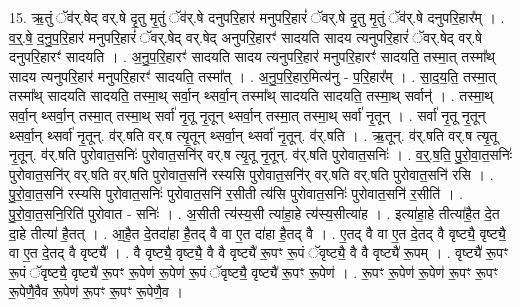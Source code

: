 \documentclass[17pt]{extarticle}
\begin{document}
15. ऋ॒तुं ॅव॑र्.षेद् वर्.षे दृ॒तु मृ॒तुं ॅव॑र्.षे दनुपरि॒हार॑ मनुपरि॒हारं॑ ॅवर्.षे दृ॒तु मृ॒तुं ॅव॑र्.षे दनुपरि॒हार᳚म् । . व॒र्॒.षे॒ द॒नु॒प॒रि॒हार॑ मनुपरि॒हारं॑ ॅवर्.षेद् वर्.षेद् अनुपरि॒हारꣳ॑ सादयति सादय त्यनुपरि॒हारं॑ ॅवर्.षेद् वर्.षे दनुपरि॒हारꣳ॑ सादयति । . अ॒नु॒प॒रि॒हारꣳ॑ सादयति सादय त्यनुपरि॒हार॑ मनुपरि॒हारꣳ॑ सादयति॒ तस्मा॒त् तस्मा᳚थ् सादय त्यनुपरि॒हार॑ मनुपरि॒हारꣳ॑ सादयति॒ तस्मा᳚त् । . अ॒नु॒प॒रि॒हार॒मित्य॑नु - प॒रि॒हार᳚म् । . सा॒द॒य॒ति॒ तस्मा॒त् तस्मा᳚थ् सादयति सादयति॒ तस्मा॒थ् सर्वा॒न् थ्सर्वा॒न् तस्मा᳚थ् सादयति सादयति॒ तस्मा॒थ् सर्वान्॑ । . तस्मा॒थ् सर्वा॒न् थ्सर्वा॒न् तस्मा॒त् तस्मा॒थ् सर्वा॑ नृ॒तू नृ॒तून् थ्सर्वा॒न् तस्मा॒त् तस्मा॒थ् सर्वा॑ नृ॒तून् । . सर्वा॑ नृ॒तू नृ॒तून् थ्सर्वा॒न् थ्सर्वा॑ नृ॒तून्. व॑र्.षति वर्.ष त्यृ॒तून् थ्सर्वा॒न् थ्सर्वा॑ नृ॒तून्. व॑र्.षति । . ऋ॒तून्. व॑र्.षति वर्.ष त्यृ॒तू नृ॒तून्. व॑र्.षति पुरोवात॒सनिः॑ पुरोवात॒सनि॑र् वर्.ष त्यृ॒तू नृ॒तून्. व॑र्.षति पुरोवात॒सनिः॑ । . व॒र्॒.ष॒ति॒ पु॒रो॒वा॒त॒सनिः॑ पुरोवात॒सनि॑र् वर्.षति वर्.षति पुरोवात॒सनि॑ रस्यसि पुरोवात॒सनि॑र् वर्.षति वर्.षति पुरोवात॒सनि॑ रसि । . पु॒रो॒वा॒त॒सनि॑ रस्यसि पुरोवात॒सनिः॑ पुरोवात॒सनि॑ र॒सीती त्य॑सि पुरोवात॒सनिः॑ पुरोवात॒सनि॑ र॒सीति॑ । . पु॒रो॒वा॒त॒सनि॒रिति॑ पुरोवात - सनिः॑ । . अ॒सीती त्य॑स्य॒सी त्या॑हा॒हे त्य॑स्य॒सीत्या॑ह । . इत्या॑हा॒हे तीत्या॑है॒त दे॒त दा॒हे तीत्या॑ है॒तत् । . आ॒है॒त दे॒तदा॑हा है॒तद् वै वा ए॒त दा॑हा है॒तद् वै । . ए॒तद् वै वा ए॒त दे॒तद् वै वृष्ट्यै॒ वृष्ट्यै॒ वा ए॒त दे॒तद् वै वृष्ट्यै᳚ । . वै वृष्ट्यै॒ वृष्ट्यै॒ वै वै वृष्ट्यै॑ रू॒पꣳ रू॒पं ॅवृष्ट्यै॒ वै वै वृष्ट्यै॑ रू॒पम् । . वृष्ट्यै॑ रू॒पꣳ रू॒पं ॅवृष्ट्यै॒ वृष्ट्यै॑ रू॒पꣳ रू॒पेण॑ रू॒पेण॑ रू॒पं ॅवृष्ट्यै॒ वृष्ट्यै॑ रू॒पꣳ रू॒पेण॑ । . रू॒पꣳ रू॒पेण॑ रू॒पेण॑ रू॒पꣳ रू॒पꣳ रू॒पेणै॒वैव रू॒पेण॑ रू॒पꣳ रू॒पꣳ रू॒पेणै॒व । \newline
\end{document}
